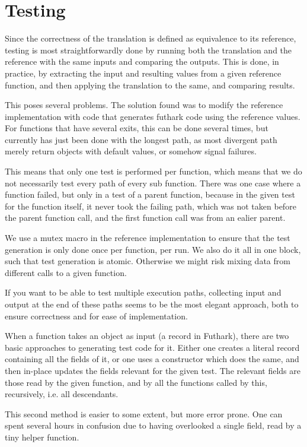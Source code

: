 \section{Testing}
Since the correctness of the translation is defined as equivalence to its reference, testing is most straightforwardly done by running both the translation and the reference with the same inputs and comparing the outputs. This is done, in practice, by extracting the input and resulting values from a given reference function, and then applying the translation to the same, and comparing results.

This poses several problems. The solution found was to modify the reference implementation with code that generates futhark code using the reference values. For functions that have several exits, this can be done several times, but currently has just been done with the longest path, as most divergent path merely return objects with default values, or somehow signal failures.

This means that only one test is performed per function, which means that we do not necessarily test every path of every sub function. There was one case where a function failed, but only in a test of a parent function, because in the given test for the function itself, it never took the failing path, which was not taken before the parent function call, and the first function call was from an ealier parent.

We use a mutex macro in the reference implementation to ensure that the test generation is only done once per function, per run. We also do it all in one block, such that test generation is atomic. Otherwise we might risk mixing data from different calls to a given function.

If you want to be able to test multiple execution paths, collecting input and output at the end of these paths seems to be the most elegant approach, both to ensure correctness and for ease of implementation.

When a function takes an object as input (a record in Futhark), there are two basic approaches to generating test code for it. Either one creates a literal record containing all the fields of it, or one uses a constructor which does the same, and then in-place updates the fields relevant for the given test. The relevant fields are those read by the given function, and by all the functions called by this, recursively, i.e. all descendants.

This second method is easier to some extent, but more error prone. One can spent several hours in confusion due to having overlooked a single field, read by a tiny helper function.

